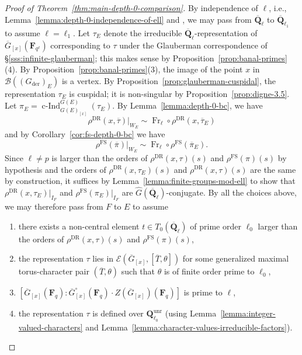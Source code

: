 \documentclass[reqno]{amsart}
\numberwithin{equation}{subsection}
\newcommand{\F}{\mathbf{F}}
\newcommand{\Q}{\mathbf{Q}}
\newcommand{\ol}[1]{\overline{#1}}
\newcommand{\wh}[1]{\widehat{#1}}
\newcommand\cB{\mathcal{B}}
\newcommand\cE{\mathcal{E}}
\DeclareMathOperator{\unr}{unr}
\DeclareMathOperator{\FS}{FS}
\DeclareMathOperator{\cInd}{c-Ind}
\DeclareMathOperator{\der}{der}
\DeclareMathOperator{\DR}{DR}
\DeclareMathOperator{\Fr}{Fr}
\theoremstyle{remark}
\numberwithin{equation}{subsection}
\numberwithin{figure}{subsection}
\begin{document}
\begin{proof}[Proof of Theorem~\ref{thm:main-depth-0-comparison}]
    By independence of $\ell$, i.e., Lemma~\ref{lemma:depth-0-independence-of-ell} and \cite[Theorem~1.1]{Sch25}, we may pass from $\ol\Q_\ell$ to $\ol\Q_{\ell_1}$ to assume $\ell = \ell_1$. Let $\tau_E$ denote the irreducible $\ol\Q_\ell$-representation of $\ol G_{[x]}(\F_{q^\ell})$ corresponding to $\tau$ under the Glauberman correspondence of \S\ref{sss:infinite-glauberman}; this makes sense by Proposition~\ref{prop:banal-primes}(4). By Proposition~\ref{prop:banal-primes}(3), the image of the point $x$ in $\cB((G_{\der})_E)$ is a vertex. By Proposition~\ref{prop:glauberman-cuspidal}, the representation $\tau_E$ is cuspidal; it is non-singular by Proposition~\ref{prop:digne-3.5}. Let $\pi_E = \cInd_{G(E)_{[x]}}^{G(E)}(\tau_E)$. By Lemma~\ref{lemma:depth-0-bc}, we have
    \[
    \rho^{\DR}(x, \ol\tau)|_{W_E} \sim \Fr_\ell \circ \rho^{\DR}(x, \ol\tau_E)
    \]
    and by Corollary~\ref{cor:fs-depth-0-bc} we have
    \[
    \rho^{\FS}(\ol\pi)|_{W_E} \sim \Fr_\ell \circ \rho^{\FS}(\ol\pi_E).
    \]
    Since $\ell \neq p$ is larger than the orders of $\rho^{\DR}(x, \tau)(s)$ and $\rho^{\FS}(\pi)(s)$ by hypothesis and the orders of $\rho^{\DR}(x, \tau_E)(s)$ and $\rho^{\DR}(x, \tau)(s)$ are the same by construction, it suffices by Lemma~\ref{lemma:finite-groups-mod-ell} to show that $\rho^{\DR}(x, \tau_E)|_{I_F}$ and $\rho^{\FS}(\pi_E)|_{I_F}$ are $\wh G(\ol\Q_\ell)$-conjugate. By all the choices above, we may therefore pass from $F$ to $E$ to assume
    \begin{enumerate}
        \item there exists a non-central element $t \in T_0(\ol\Q_\ell)$ of prime order $\ell_0$ larger than the orders of $\rho^{\DR}(x, \tau)(s)$ and $\rho^{\FS}(\pi)(s)$,
        \item the representation $\tau$ lies in $\cE(\ol G_{[x]}, [\ol T, \theta])$ for some generalized maximal torus-character pair $(\ol T, \theta)$ such that $\theta$ is of finite order prime to $\ell_0$,
        \item $[\ol G_{[x]}(\F_q): \ol G_{[x]}^\circ(\F_q) \cdot Z(\ol G_{[x]})(\F_q)]$ is prime to $\ell$,
        \item the representation $\tau$ is defined over $\Q_{\ell_0}^{\unr}$ (using Lemma~\ref{lemma:integer-valued-characters} and Lemma~\ref{lemma:character-values-irreducible-factors}).
    \end{enumerate}


\end{proof}
\end{document}
